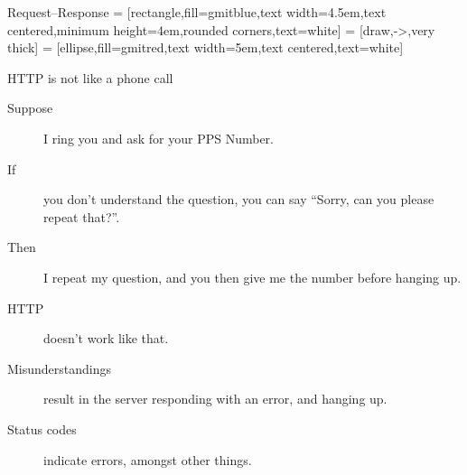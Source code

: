 \begin{frame}{Request--Response}
   = [rectangle,fill=gmitblue,text width=4.5em,text centered,minimum height=4em,rounded corners,text=white]
   = [draw,->,very thick]
   = [ellipse,fill=gmitred,text width=5em,text centered,text=white]
  \begin{adjustbox}{max width={0.9\textwidth},center} 
  \end{adjustbox}
\end{frame}


\begin{frame}{HTTP is not like a phone call}
  \begin{description}
		\item[Suppose] I ring you and ask for your PPS Number.
    \item[If] you don't understand the question, you can say ``Sorry, can you please repeat that?''.
    \item[Then] I repeat my question, and you then give me the number before hanging up.\\[1cm]
    \item[HTTP] doesn't work like that.
    \item[Misunderstandings] result in the server responding with an error, and hanging up.
    \item[Status codes] indicate errors, amongst other things.
  \end{description}
\end{frame}


